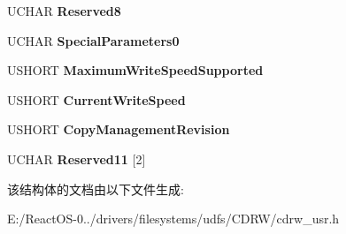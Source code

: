\begin{DoxyCompactItemize}
U\+C\+H\+AR {\bfseries Reserved8}
\item 
\mbox{\label{struct___g_e_t___c_a_p_a_b_i_l_i_t_i_e_s___u_s_e_r___o_u_t_a4acbe4d12637cbf9c15e1224a66ecc02}} 
U\+C\+H\+AR {\bfseries Special\+Parameters0}
\item 
\mbox{\label{struct___g_e_t___c_a_p_a_b_i_l_i_t_i_e_s___u_s_e_r___o_u_t_aa728475a9c47ceeb0bc134101f2419b4}} 
U\+S\+H\+O\+RT {\bfseries Maximum\+Write\+Speed\+Supported}
\item 
\mbox{\label{struct___g_e_t___c_a_p_a_b_i_l_i_t_i_e_s___u_s_e_r___o_u_t_aca566f0483a09b8517337210dc274e6d}} 
U\+S\+H\+O\+RT {\bfseries Current\+Write\+Speed}
\item 
\mbox{\label{struct___g_e_t___c_a_p_a_b_i_l_i_t_i_e_s___u_s_e_r___o_u_t_a24b7a3bd82db8eca86f7ad846b44907a}} 
U\+S\+H\+O\+RT {\bfseries Copy\+Management\+Revision}
\item 
\mbox{\label{struct___g_e_t___c_a_p_a_b_i_l_i_t_i_e_s___u_s_e_r___o_u_t_ac5bd1de8a44d635b5be7e19092195e60}} 
U\+C\+H\+AR {\bfseries Reserved11} \mbox{[}2\mbox{]}
\end{DoxyCompactItemize}


该结构体的文档由以下文件生成\+:\begin{DoxyCompactItemize}
\item 
E\+:/\+React\+O\+S-\/0../drivers/filesystems/udfs/\+C\+D\+R\+W/cdrw\+\_\+usr.\+h\end{DoxyCompactItemize}
